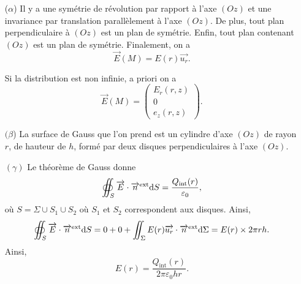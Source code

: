             \begin{itemize}
                \item [($\alpha$)] Il y a une symétrie de révolution par rapport à l'axe $(Oz)$ et une invariance par translation parallèlement à l'axe $(Oz)$. De plus, tout plan perpendiculaire à $(Oz)$ est un plan de symétrie. Enfin, tout plan contenant $(Oz)$ est un plan de symétrie. Finalement, on a 
                \begin{equation*}
                    \boxed{
                    \vec{E}(M)=E(r)\vec{u_r}.
                    }
                \end{equation*}
                \begin{remark}
                    Si la distribution est non infinie, a priori on a 
                    \begin{equation*}
                        \vec{E}(M)=\begin{pmatrix}
                            E_r(r,z)\\0\\e_z(r,z)
                        \end{pmatrix}.
                    \end{equation*}
                \end{remark}

                \item [$(\beta$)] La surface de Gauss que l'on prend est un cylindre d'axe $(Oz)$ de rayon $r$, de hauteur de $h$, formé par deux disques perpendiculaires à l'axe $(Oz)$.
                
                \item [$(\gamma)$] Le théorème de Gauss donne
                \begin{equation*}
                    \oiint_{S}\protect\overrightarrow{{E}}\cdot\protect\overrightarrow{{n}}^{\text{ext}}\mathrm{d} S=\frac{Q_{\text{int}}(r)}{\varepsilon_{0}},
                \end{equation*}
                où $S=\Sigma\cup S_1\cup S_2$ où $S_1$ et $S_2$ correspondent aux disques. Ainsi, 
                \begin{equation*}
                    \oiint_{S}\protect\overrightarrow{{E}}\cdot\protect\overrightarrow{{n}}^{\text{ext}}\mathrm{d} S=0+0+\iint_{\Sigma}E(r)\protect\overrightarrow{{u_r}}\cdot\protect\overrightarrow{{n}}^{\text{ext}}\mathrm{d} \Sigma=E(r)\times 2\pi r h.
                \end{equation*}
                Ainsi,
                \begin{equation*}
                    \boxed{
                        E(r)=\frac{Q_{\text{int}}(r)}{2\pi\varepsilon_{0}hr}.
                    }
                \end{equation*}

            \end{itemize}


